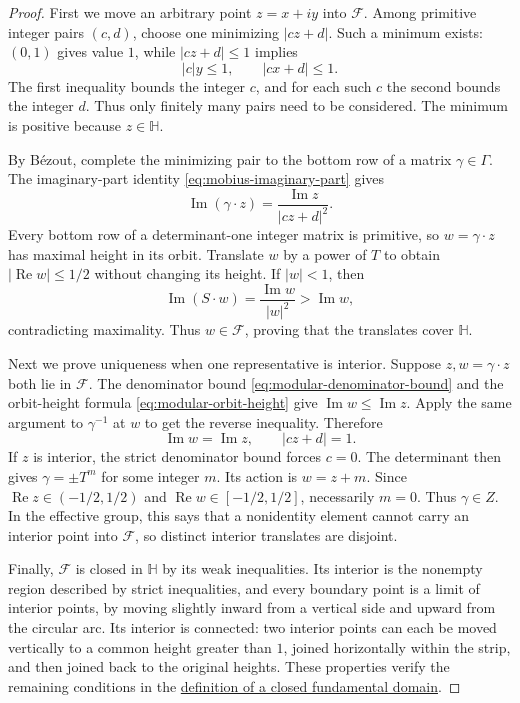 \begin{proof}
First we move an arbitrary point $z=x+iy$ into $\mathcal F$. Among primitive integer pairs $(c,d)$, choose one minimizing $|cz+d|$. Such a minimum exists: $(0,1)$ gives value $1$, while $|cz+d|\leq1$ implies
\[
 |c|y\leq1,\qquad |cx+d|\leq1.
\]
The first inequality bounds the integer $c$, and for each such $c$ the second bounds the integer $d$. Thus only finitely many pairs need to be considered. The minimum is positive because $z\in\mathbb H$.

By B\'ezout, complete the minimizing pair to the bottom row of a matrix $\gamma\in\Gamma$. The imaginary-part identity \eqref{eq:mobius-imaginary-part} gives
\begin{equation}\label{eq:modular-orbit-height}
 \operatorname{Im}(\gamma\cdot z)=\frac{\operatorname{Im}z}{|cz+d|^2}.
\end{equation}
Every bottom row of a determinant-one integer matrix is primitive, so $w=\gamma\cdot z$ has maximal height in its orbit. Translate $w$ by a power of $T$ to obtain $|\operatorname{Re}w|\leq1/2$ without changing its height. If $|w|<1$, then
\[
 \operatorname{Im}(S\cdot w)=\frac{\operatorname{Im}w}{|w|^2}>\operatorname{Im}w,
\]
contradicting maximality. Thus $w\in\mathcal F$, proving that the translates cover $\mathbb H$.

Next we prove uniqueness when one representative is interior. Suppose $z,w=\gamma\cdot z$ both lie in $\mathcal F$. The denominator bound \eqref{eq:modular-denominator-bound} and the orbit-height formula \eqref{eq:modular-orbit-height} give $\operatorname{Im}w\leq\operatorname{Im}z$. Apply the same argument to $\gamma^{-1}$ at $w$ to get the reverse inequality. Therefore
\begin{equation}\label{eq:modular-domain-height-equality}
 \operatorname{Im}w=\operatorname{Im}z,\qquad |cz+d|=1.
\end{equation}
If $z$ is interior, the strict denominator bound forces $c=0$. The determinant then gives $\gamma=\pm T^m$ for some integer $m$. Its action is $w=z+m$. Since $\operatorname{Re}z\in(-1/2,1/2)$ and $\operatorname{Re}w\in[-1/2,1/2]$, necessarily $m=0$. Thus $\gamma\in Z$. In the effective group, this says that a nonidentity element cannot carry an interior point into $\mathcal F$, so distinct interior translates are disjoint.

Finally, $\mathcal F$ is closed in $\mathbb H$ by its weak inequalities. Its interior is the nonempty region described by strict inequalities, and every boundary point is a limit of interior points, by moving slightly inward from a vertical side and upward from the circular arc. Its interior is connected: two interior points can each be moved vertically to a common height greater than $1$, joined horizontally within the strip, and then joined back to the original heights. These properties verify the remaining conditions in the \hyperref[modular.fundamental-domain-definition]{definition of a closed fundamental domain}.
\end{proof}

